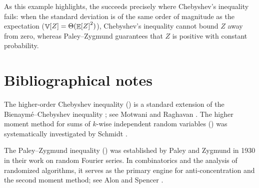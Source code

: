 \bigskip

As this example highlights, the  succeeds precisely where Chebyshev's inequality fails: when the standard deviation is of the same order of magnitude as the expectation ($\mathop{\mathbb{V}}\!\left[ {Z} \right] = \Theta(\mathop{\mathbb{E}}\!\left[ {Z} \right]^2)$), Chebyshev's inequality cannot bound $Z$ away from zero, whereas Paley--Zygmund guarantees that $Z$ is positive with constant probability.


\section{Bibliographical notes}

The higher-order Chebyshev inequality () is a
standard extension of the Bienaym{\'e}--Chebyshev inequality
\cite{b-cadld-1853, c-dvm-1867}; see Motwani and Raghavan
\cite[Chapter~3]{mr-ra-95}.  The higher moment method for sums of
$k$-wise independent random variables () was systematically
investigated by Schmidt \etal \cite{sss-chbal-95}.

The Paley--Zygmund inequality () was established
by Paley and Zygmund in 1930 \cite{pz-nafv-30, pz-naf-32} in their work
on random Fourier series. In combinatorics and the analysis of randomized
algorithms, it serves as the primary engine for anti-concentration and
the second moment method; see Alon and Spencer \cite[Chapter~4]{as-pm-00}.


{}


\ChapterEnd{}



